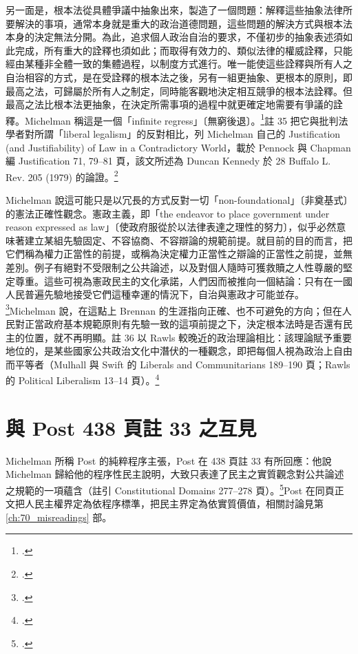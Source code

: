另一面是，根本法從具體爭議中抽象出來，製造了一個問題：解釋這些抽象法律所要解決的事項，通常本身就是重大的政治道德問題，這些問題的解決方式與根本法本身的決定無法分開。為此，追求個人政治自治的要求，不僅初步的抽象表述須如此完成，所有重大的詮釋也須如此；而取得有效力的、類似法律的權威詮釋，只能經由某種非全體一致的集體過程，以制度方式進行。唯一能使這些詮釋與所有人之自治相容的方式，是在受詮釋的根本法之後，另有一組更抽象、更根本的原則，即最高之法，可歸屬於所有人之制定，同時能客觀地決定相互競爭的根本法詮釋。但最高之法比根本法更抽象，在決定所需事項的過程中就更確定地需要有爭議的詮釋。Michelman 稱這是一個「infinite regress」〔無窮後退〕。\footcite[409--410]{michelman1998}註 35 把它與批判法學者對所謂「liberal legalism」的反對相比，列 Michelman 自己的 Justification (and Justifiability) of Law in a Contradictory World，載於 Pennock 與 Chapman 編 Justification 71, 79--81 頁，該文所述為 Duncan Kennedy 於 28 Buffalo L. Rev. 205 (1979) 的論證。\footcite[410 n.35]{michelman1998}

Michelman 說這可能只是以冗長的方式反對一切「non-foundational」〔非奠基式〕的憲法正確性觀念。憲政主義，即「the endeavor to place government under reason expressed as law」〔使政府服從於以法律表達之理性的努力〕，似乎必然意味著建立某組先驗固定、不容協商、不容辯論的規範前提。就目前的目的而言，把它們稱為權力正當性的前提，或稱為決定權力正當性之辯論的正當性之前提，並無差別。例子有絕對不受限制之公共論述，以及對個人隨時可獲救贖之人性尊嚴的堅定尊重。這些可視為憲政民主的文化承諾，人們因而被推向一個結論：只有在一國人民普遍先驗地接受它們這種幸運的情況下，自治與憲政才可能並存。\footcite[410]{michelman1998}Michelman 說，在這點上 Brennan 的生涯指向正確、也不可避免的方向；但在人民對正當政府基本規範原則有先驗一致的這項前提之下，決定根本法時是否還有民主的位置，就不再明顯。註 36 以 Rawls 較晚近的政治理論相比：該理論賦予重要地位的，是某些國家公共政治文化中潛伏的一種觀念，即把每個人視為政治上自由而平等者（Mulhall 與 Swift 的 Liberals and Communitarians 189--190 頁；Rawls 的 Political Liberalism 13--14 頁）。\footcite[410 \& n.36]{michelman1998}

\section{與 Post 438 頁註 33 之互見}
\label{sec:20_responsive-8}

Michelman 所稱 Post 的純粹程序主張，Post 在 438 頁註 33 有所回應：他說 Michelman 歸給他的程序性民主說明，大致只表達了民主之實質觀念對公共論述之規範的一項蘊含（註引 Constitutional Domains 277--278 頁）。\footcite[438 \& n.33]{post1998}Post 在同頁正文把人民主權界定為依程序標準，把民主界定為依實質價值，相關討論見第 \ref{ch:70_misreadings} 部。

